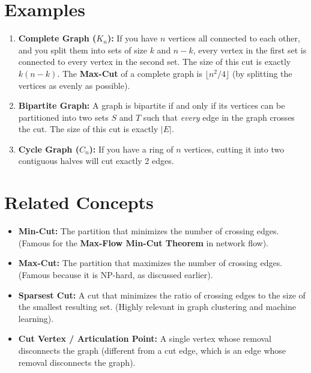 \documentclass[11pt]{article}
\begin{document}
\hrulefill

\section{Examples}

\begin{enumerate}
    \item \textbf{Complete Graph (\(K_n\)):} 
    If you have \(n\) vertices all connected to each other, and you split them into sets of size \(k\) and \(n-k\), every vertex in the first set is connected to every vertex in the second set. The size of this cut is exactly \(k(n-k)\). The \textbf{Max-Cut} of a complete graph is \(\lfloor n^2/4 \rfloor\) (by splitting the vertices as evenly as possible).
    \item \textbf{Bipartite Graph:}
    A graph is bipartite if and only if its vertices can be partitioned into two sets \(S\) and \(T\) such that \emph{every} edge in the graph crosses the cut. The size of this cut is exactly \(|E|\).
    \item \textbf{Cycle Graph (\(C_n\)):}
    If you have a ring of \(n\) vertices, cutting it into two contiguous halves will cut exactly 2 edges.
\end{enumerate}

\hrulefill

\section{Related Concepts}
\begin{itemize}
    \item \textbf{Min-Cut:} The partition that minimizes the number of crossing edges. (Famous for the \textbf{Max-Flow Min-Cut Theorem} in network flow).
    \item \textbf{Max-Cut:} The partition that maximizes the number of crossing edges. (Famous because it is NP-hard, as discussed earlier).
    \item \textbf{Sparsest Cut:} A cut that minimizes the ratio of crossing edges to the size of the smallest resulting set. (Highly relevant in graph clustering and machine learning).
    \item \textbf{Cut Vertex / Articulation Point:} A single vertex whose removal disconnects the graph (different from a cut edge, which is an edge whose removal disconnects the graph).
\end{itemize}
\end{document}
